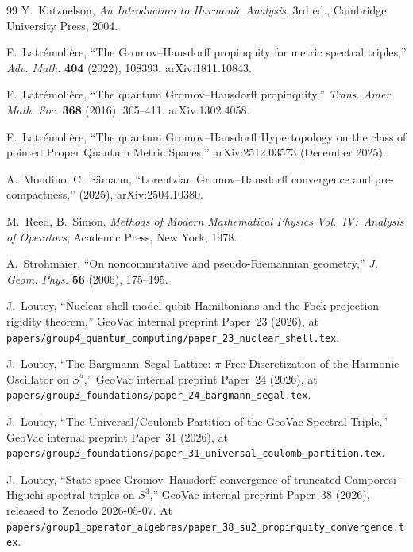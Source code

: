 \documentclass[11pt,a4paper]{article}
\theoremstyle{plain}
\theoremstyle{definition}
\begin{document}
\begin{thebibliography}{99}
Y.~Katznelson, \emph{An Introduction to Harmonic Analysis}, 3rd ed.,
Cambridge University Press, 2004.

F.~Latr\'emoli\`ere, ``The Gromov--Hausdorff propinquity for
metric spectral triples,'' \emph{Adv. Math.} \textbf{404} (2022),
108393. arXiv:1811.10843.

F.~Latr\'emoli\`ere, ``The quantum Gromov--Hausdorff propinquity,''
\emph{Trans. Amer. Math. Soc.} \textbf{368} (2016), 365--411.
arXiv:1302.4058.

F.~Latr\'emoli\`ere, ``The quantum Gromov--Hausdorff Hypertopology
on the class of pointed Proper Quantum Metric Spaces,''
arXiv:2512.03573 (December 2025).

A.~Mondino, C.~Sämann, ``Lorentzian Gromov--Hausdorff
convergence and pre-compactness,'' (2025), arXiv:2504.10380.

M.~Reed, B.~Simon, \emph{Methods of Modern Mathematical Physics
Vol.~IV:\ Analysis of Operators}, Academic Press, New York, 1978.

A.~Strohmaier, ``On noncommutative and pseudo-Riemannian geometry,''
\emph{J. Geom. Phys.} \textbf{56} (2006), 175--195.


J.~Loutey, ``Nuclear shell model qubit Hamiltonians and the Fock
projection rigidity theorem,'' GeoVac internal preprint Paper~23
(2026), at
\texttt{papers/group4\_quantum\_computing/paper\_23\_nuclear\_shell.tex}.

J.~Loutey, ``The Bargmann--Segal Lattice: $\pi$-Free Discretization
of the Harmonic Oscillator on $S^5$,'' GeoVac internal preprint Paper~24
(2026), at
\texttt{papers/group3\_foundations/paper\_24\_bargmann\_segal.tex}.

J.~Loutey, ``The Universal/Coulomb Partition of the GeoVac Spectral
Triple,'' GeoVac internal preprint Paper~31 (2026), at
\texttt{papers/group3\_foundations/paper\_31\_universal\_coulomb\_partition.tex}.

J.~Loutey, ``State-space Gromov--Hausdorff convergence of truncated
Camporesi--Higuchi spectral triples on $S^3$,'' GeoVac internal preprint Paper~38 (2026),
released to Zenodo 2026-05-07. At
\texttt{papers/group1\_operator\_algebras/paper\_38\_su2\_propinquity\_convergence.tex}.


\end{thebibliography}
\end{document}
